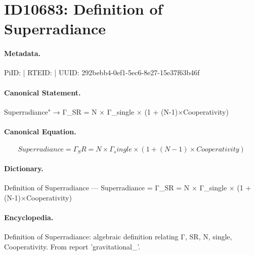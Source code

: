 \section*{ID10683: Definition of Superradiance}
\paragraph{Metadata.}
PiID:  | RTEID:  | UUID: 292bebb4-0ef1-5ec6-8e27-15e37f63b46f

\paragraph{Canonical Statement.}
Superradiance" → Γ\_SR = N × Γ\_single × (1 + (N-1)×Cooperativity)

\paragraph{Canonical Equation.}
\[
Superradiance = Γ_SR = N × Γ_single × (1 + (N-1)×Cooperativity)
\]

\paragraph{Dictionary.}
Definition of Superradiance — Superradiance = Γ\_SR = N × Γ\_single × (1 + (N-1)×Cooperativity)

\paragraph{Encyclopedia.}
Definition of Superradiance: algebraic definition relating Γ, SR, N, single, Cooperativity. From report 'gravitational\_'.
